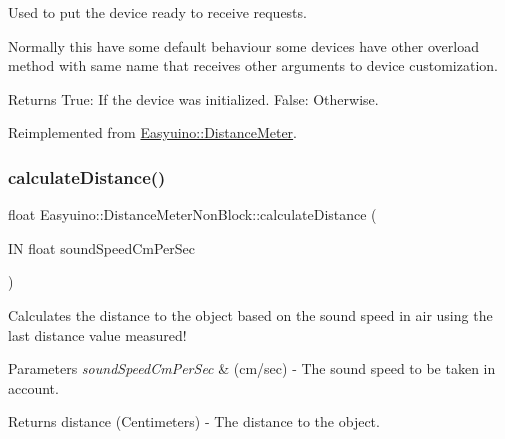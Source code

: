 Used to put the device ready to receive requests. 

Normally this have some default behaviour some devices have other overload method with same name that receives other arguments to device customization. \begin{DoxyReturn}{Returns}
True\+: If the device was initialized. False\+: Otherwise. 
\end{DoxyReturn}


Reimplemented from \hyperlink{class_easyuino_1_1_distance_meter_a0374e6f806cd71f0f918c6ea7b7700a0}{Easyuino\+::\+Distance\+Meter}.

\mbox{\label{class_easyuino_1_1_distance_meter_non_block_aa51eb173540f65e000189ac7137e699a}} 
\subsubsection{\texorpdfstring{calculate\+Distance()}{calculateDistance()}}
{\footnotesize\ttfamily float Easyuino\+::\+Distance\+Meter\+Non\+Block\+::calculate\+Distance (\begin{DoxyParamCaption}\item[{IN float}]{sound\+Speed\+Cm\+Per\+Sec }\end{DoxyParamCaption})\hspace{0.3cm}{\ttfamily [protected]}}



Calculates the distance to the object based on the sound speed in air using the last distance value measured! 


\begin{DoxyParams}{Parameters}
{\em sound\+Speed\+Cm\+Per\+Sec} & (cm/sec) -\/ The sound speed to be taken in account. \\
\hline
\end{DoxyParams}
\begin{DoxyReturn}{Returns}
distance (Centimeters) -\/ The distance to the object. 
\end{DoxyReturn}
\mbox{\label{class_easyuino_1_1_distance_meter_non_block_a845d4db657ff408205d1cdb3c35982a4}} 

